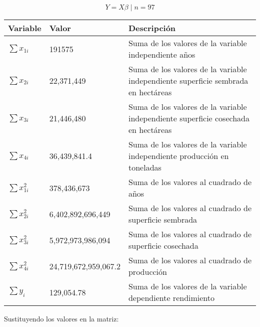 \documentclass[spanish,12pt,a4paper]{article}
\begin{document}
\begin{enumerate}[label=\alph*)]
		
		\[
			Y = X\beta \mid n = 97
		\]
		
		\begin{table}[H]
			\centering
			\begin{adjustbox}{max width=\linewidth}
			\begin{tabular}{lll}
				\toprule
				Variable & Valor & Descripción \\
				\midrule
				$\sum x_{1i}$ & 191575 & Suma de los valores de la variable independiente años \\
				$\sum x_{2i}$ & 22,371,449 & Suma de los valores de la variable independiente superficie sembrada en hectáreas \\
				$\sum x_{3i}$ & 21,446,480 & Suma de los valores de la variable independiente superficie cosechada en hectáreas \\
				$\sum x_{4i}$ & 36,439,841.4 & Suma de los valores de la variable independiente producción en toneladas \\
				$\sum x^2_{1i}$ & 378,436,673 & Suma de los valores al cuadrado de años \\
				$\sum x^2_{2i}$ & 6,402,892,696,449 & Suma de los valores al cuadrado de superficie sembrada \\
				$\sum x^2_{3i}$ & 5,972,973,986,094 & Suma de los valores al cuadrado de superficie cosechada \\
				$\sum x^2_{4i}$ & 24,719,672,959,067.2 & Suma de los valores al cuadrado de producción \\
				$\sum y_i$ & 129,054.78 & Suma de los valores de la variable dependiente rendimiento \\
				\bottomrule
			\end{tabular}
			\end{adjustbox}
		\end{table}
		
		Sustituyendo los valores en la matriz:
		

\end{enumerate}
\end{document}
